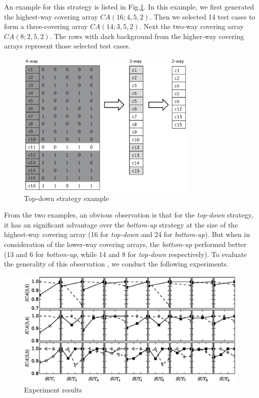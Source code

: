 \documentclass[conference]{IEEEtran}
\theoremstyle{definition}
\begin{document}
An example for this strategy is listed in Fig.\ref{decrease-example}. In this example, we first generated the highest-way covering array $CA(16; 4, 5, 2)$. Then we selected 14 test cases to form a three-covering array $CA(14; 3, 5, 2)$. Next the two-way covering array $CA(8; 2, 5, 2)$. The rows with dark background from the higher-way covering arrays represent those selected test cases.

\begin{figure}
 \includegraphics[width=3.4in]{decrease_example.eps}
\caption{Top-down strategy example}
\label{decrease-example}
\end{figure}


From the two examples, an obvious observation is that for the \emph{top-down} strategy, it has an significant advantage over the \emph{bottom-up} strategy at the size of the highest-way covering array (16 for \emph{top-down} and 24 for \emph{bottom-up}). But when in consideration of the lower-way covering arrays, the \emph{bottom-up} performed better (13 and 6 for \emph{bottom-up}, while 14 and 8 for \emph{top-down} respectively).  To evaluate the generality of this observation , we conduct the following experiments.
\begin{figure}[htbp]
 \includegraphics[width=7.5in]{experiment.eps}
\caption{Experiment results}
\label{experiement}
\end{figure}
\end{document}
